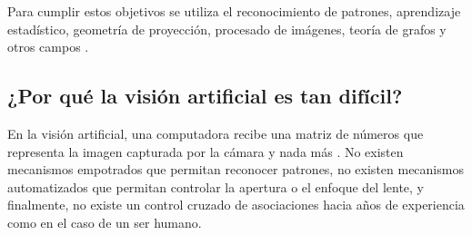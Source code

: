Para cumplir estos objetivos se utiliza el reconocimiento de patrones, aprendizaje estad\'{i}stico, geometr\'{i}a de proyecci\'{o}n, procesado de im\'{a}genes, teor\'{i}a de grafos y otros campos \cite{Cryer_Shah_1999,Faugeras_1993,Cyganek_Siebert_2009,Forsyth_Ponce_2002,Hartley_Zisserman_2003}.








\subsection{¿Por qu\'{e} la visi\'{o}n artificial es tan dif\'{i}cil?}
En la visi\'{o}n artificial, una computadora recibe una matriz de n\'{u}meros que re\-pre\-senta la imagen capturada por la c\'{a}mara y nada m\'{a}s \cite{Shah_1983,Bradski_Kaehler_2008,Szeliski_2010,Cyganek_Siebert_2009}. No existen mecanismos empotrados que permitan reconocer patrones, no existen mecanismos automatizados que permitan controlar la apertura o el enfoque del lente, y finalmente, no existe un control cruzado de asociaciones hacia años de experiencia como en el caso de un ser humano.

